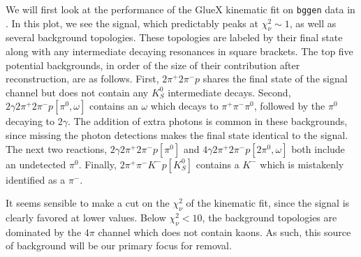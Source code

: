 We will first look at the performance of the GlueX kinematic fit on \texttt{bggen} data in . In this plot, we see the signal, which predictably peaks at $\chi^2_\nu \sim 1$, as well as several background topologies. These topologies are labeled by their final state along with any intermediate decaying resonances in square brackets. The top five potential backgrounds, in order of the size of their contribution after reconstruction, are as follows. First, $2\pi^+2\pi^- p$ shares the final state of the signal channel but does not contain any $K_S^0$ intermediate decays. Second, $2\gamma 2\pi^+ 2\pi^- p [\pi^0, \omega]$ contains an $\omega$ which decays to $\pi^+\pi^-\pi^0$, followed by the $\pi^0$ decaying to $2\gamma$. The addition of extra photons is common in these backgrounds, since missing the photon detections makes the final state identical to the signal. The next two reactions, $2\gamma 2\pi^+ 2\pi^- p [\pi^0]$ and $4\gamma 2\pi^+ 2\pi^- p [2\pi^0, \omega]$ both include an undetected $\pi^0$. Finally, $2\pi^+\pi^- K^- p[K_S^0]$ contains a $K^-$ which is mistakenly identified as a $\pi^-$.

It seems sensible to make a cut on the $\chi^2_\nu$ of the kinematic fit, since the signal is clearly favored at lower values. Below $\chi^2_\nu < 10$, the background topologies are dominated by the $4\pi$ channel which does not contain kaons. As such, this source of background will be our primary focus for removal.
